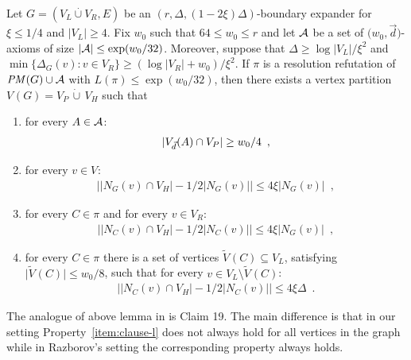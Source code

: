 \documentclass{article}
\providecommand{\abs}[1]{\lvert#1\rvert}
\providecommand{\Abs}[1]{\bigl\lvert#1\bigr\rvert}
\newcommand{\minofset}[3][:]{\min \{ #2 #1 #3 \}}
\newcommand{\setsize}[1]{\lvert#1\rvert}
\newcommand{\disjointunion}{\overset{.}{\cup}}
\newcommand{\eqperiod}{\enspace .}
\newcommand{\eqcomma}{\enspace ,}
\newcommand{\refpi}{\pi}
\newcommand{\genericformsmall}[2]{\mathit{#1}( #2 )}
\newcommand{\length}[1]{\genericformsmall{L}{#1}}
\newcommand{\formulaformat}[1]{\mathit{#1}}
\newcommand{\PM}{PM(G)}
\renewcommand{\PM}{\formulaformat{PM}(G)}
\newcommand{\neigh}[2][]{N_{{#1}}(#2)}
\renewcommand{\deg}[2][XXXXXXXXXXXX]{\Delta_{#1}(#2)}
\newcommand{\diff}{\xi}
\newcommand{\GdegMax}{\Delta}
\newcommand{\V}[1][]{V_{#1}}
\newcommand{\Vl}{\V[L]}
\newcommand{\Vr}{\V[R]}
\newcommand{\Vp}{\V[P]}
\newcommand{\Vh}{\V[H]}
\newcommand{\Vbad}[2][]{\widetilde V^{#1}(#2)}
\newcommand{\Ax}{\ensuremath\mathcal{A}}
\newcommand{\vecthr}{\vec{d}}
\newcommand{\Vfat}[1]{\ensuremath V_{\vecthr}(#1)}
\newcommand{\fakeaxiom}{$\bigl( w_0, \vecthr \bigr)$-axiom\xspace}
\numberwithin{equation}{section}
\begin{document}
\begin{lemma}\label{lem:partition}
  Let $G = ( \Vl \disjointunion \Vr, E)$ be an $(r, \GdegMax, \left( 1 - 2 \diff \right)
  \GdegMax)$-boundary expander for $\diff \leq 1/4$ and $\setsize{\Vl} \geq 4$. Fix $w_0$ such
  that $64\leq w_0 \leq r$ and let $\Ax$ be a set of \fakeaxiom{s}
  of size $\setsize{\Ax} \le \exp({w_0 / 32})$. Moreover, suppose that
  $\GdegMax \geq \log \setsize{\Vl}/\diff^2$ and
  $\minofset{\deg[G]{v}}{v \in \Vr} \geq (\log \setsize{\Vr} + w_0) / \diff^2$.    
  If $\refpi$ is a resolution refutation of $\PM \cup \Ax$ with $\length{\refpi} \leq
  \exp({w_0/32})$, then there exists a vertex partition $\V(G) = \Vp\, \dot \cup\, \Vh$ such that
  \begin{enumerate}
  \item for every $A \in \Ax$: \label{item:thick}\begin{align*}
      \abs{ \Vfat{A} \cap \Vp } \ge w_0 / 4 \eqcomma
    \end{align*}
  \item for every $v \in \V$: \label{item:graph}\begin{align*}
      \Abs{ \abs{ \neigh[G]{v} \cap \Vh } -
      1/2\abs{ \neigh[G]{v} } } \le
      4 \diff \abs{ \neigh[G]{v} }  \eqcomma
    \end{align*}
  \item for every $C \in \refpi$ and for every $v \in \Vr$: \label{item:clause-r}\begin{align*}
      \Abs{ \abs{ \neigh[C]{v} \cap \Vh } -
      1/2\abs{ \neigh[C]{v} } } \le
      4 \diff \abs{ \neigh[G]{v} }  \eqcomma
    \end{align*}
  \item for every $C \in \refpi$ there is a set of vertices $\Vbad{C}
    \subseteq \Vl$, satisfying $\setsize{ \Vbad{C} } \le w_0/8$, such
    that for every $v \in \Vl \setminus
    \Vbad{C}$: \label{item:clause-l}\begin{align*}
      \Abs{ \abs{ \neigh[C]{v} \cap \Vh } -
      1/2\abs{ \neigh[C]{v} } } \le
      4 \diff \GdegMax \eqperiod
    \end{align*}
    \label{item:badset}
  \end{enumerate}
\end{lemma}

The analogue of above lemma in
\cite{Razborov04ResolutionLowerBoundsPM} is Claim 19.  The main
difference is that in our setting Property~\ref{item:clause-l} does
not always hold for all vertices in the graph while in Razborov's
setting the corresponding property always holds.
\end{document}
